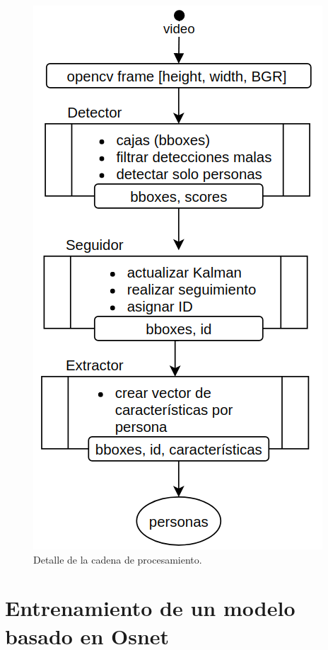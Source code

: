 \begin{figure}[ht]
	\centering
	\includegraphics[scale=.75]{./Figures/aporteModelos2.png}
	\caption{Detalle de la cadena de procesamiento.}
	\label{fig:aporteModelos2}
\end{figure}

\newpage


\section{Entrenamiento de un modelo basado en Osnet}
\label{sec:entrenamientoOsnet}

